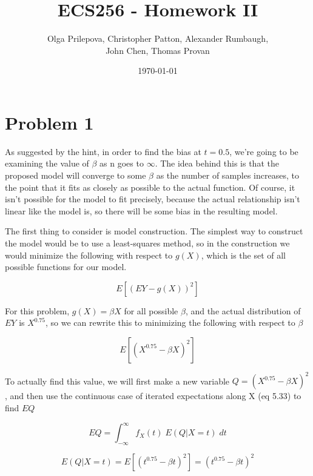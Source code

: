 \documentclass[letter]{article}
\author{Olga Prilepova, Christopher Patton, Alexander Rumbaugh, \\ John Chen, Thomas Provan}
\date{\today}
\title{ECS256 - Homework II}
\begin{document}
\maketitle
\tableofcontents

\pagebreak

\section{Problem 1} 

As suggested by the hint, in order to find the bias at $t=0.5$, we're going to be examining the value of $\beta$ as n goes to $\infty$. The idea behind this is that the proposed model will converge to some $\beta$ as the number of samples increases, to the point that it fits as closely as possible to the actual function. Of course, it isn't possible for the model to fit precisely, because the actual relationship isn't linear like the model is, so there will be some bias in the resulting model. 

The first thing to consider is model construction. The simplest way to construct the model would be to use a least-squares method, so in the construction we would  minimize the following with respect to $g(X)$, which is the set of all possible functions for our model.

\begin{equation}
	E[(EY - g(X))^2]
\end{equation}

For this problem, $g(X)=\beta X$ for all possible $\beta$, and the actual distribution of $EY$ is $X^{0.75}$, so we can rewrite this to minimizing the following with respect to $\beta$

\begin{equation}
	E[(X^{0.75} - \beta X)^2]
\end{equation}

To actually find this value, we will first make a new variable $Q=(X^{0.75} - \beta X)^2$, and then use the continuous case of iterated expectations along X (eq 5.33) to find $EQ$

\begin{equation}
	EQ = \int _{-\infty} ^\infty f_X(t) \; E(Q | X = t)\; dt
\end{equation}

\begin{equation}
	E(Q | X = t) = E[(t^{0.75} - \beta t)^2] = (t^{0.75} - \beta t)^2
\end{equation}
\end{document}
